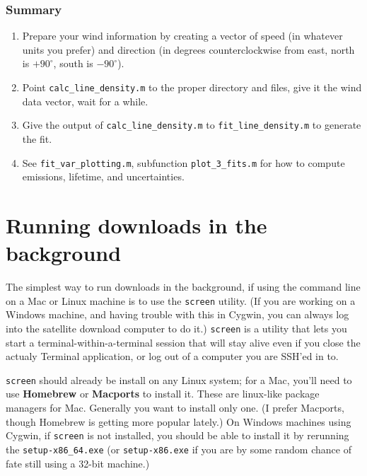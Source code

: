 \documentclass[12pt]{article}
\begin{document}
		\subsubsection{Summary}
		\begin{enumerate}
		\item Prepare your wind information by creating a vector of speed (in whatever units you prefer) and direction (in degrees counterclockwise from east, north is $+90^\circ$, south is $-90^\circ$).
		\item Point \lstinline$calc_line_density.m$ to the proper directory and files, give it the wind data vector, wait for a while.
		\item Give the output of \lstinline$calc_line_density.m$ to \lstinline$fit_line_density.m$ to generate the fit.
		\item See \lstinline$fit_var_plotting.m$, subfunction \lstinline$plot_3_fits.m$ for how to compute emissions, lifetime, and uncertainties.
		\end{enumerate}
		
	


\newpage
\label{thebib}




\newpage
\appendix
\appendixpage
\addappheadtotoc

\section{Running downloads in the background}

	The simplest way to run downloads in the background, if using the command line on a Mac or Linux machine is to use the \lstinline$screen$ utility. (If you are working on a Windows machine, and having trouble with this in Cygwin, you can always log into the satellite download computer to do it.) \lstinline$screen$ is a utility that lets you start a terminal-within-a-terminal session that will stay alive even if you close the actualy Terminal application, or log out of a computer you are SSH'ed in to.
	
	\lstinline$screen$ should already be install on any Linux system; for a Mac, you'll need to use \textbf{Homebrew} or \textbf{Macports} to install it. These are linux-like package managers for Mac. Generally you want to install only one. (I prefer Macports, though Homebrew is getting more popular lately.)  On Windows machines using Cygwin, if \lstinline$screen$ is not installed, you should be able to install it by rerunning the \lstinline$setup-x86_64.exe$ (or \lstinline$setup-x86.exe$ if you are by some random chance of fate still using a 32-bit machine.)
	
\end{document}

